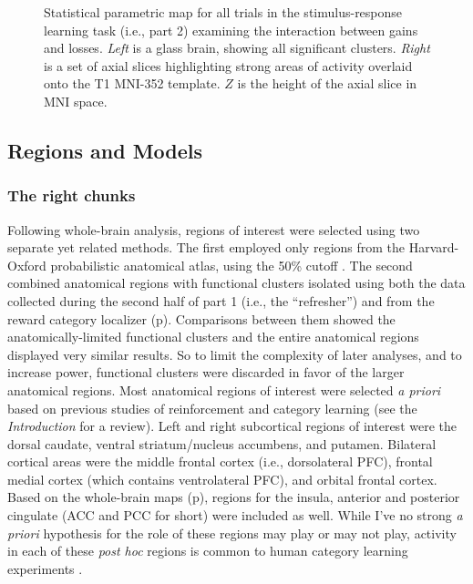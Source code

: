 \documentclass[doc,12pt]{apa}        %
\begin{document}
\begin{figure}[tp]
    \centering
	\caption{Statistical parametric map for all trials in the stimulus-response learning task (i.e., part 2) examining the interaction between gains and losses.  \emph{Left} is a glass brain, showing all significant clusters.  \emph{Right} is a set of axial slices highlighting strong areas of activity overlaid onto the T1 MNI-352 template.  $Z$ is the height of the axial slice in MNI space.}
	\label{fig:gxl}
\end{figure}

\subsection{Regions and Models}
\label{sub:regoins}
\subsubsection{The right chunks}
\label{subsub:chunks}
Following whole-brain analysis, regions of interest were selected using two separate yet related methods.  The first employed only regions from the Harvard-Oxford probabilistic anatomical atlas, using the 50\% cutoff \cite{Desikan:2006p9370}.  The second combined anatomical regions with functional clusters isolated using both the data collected during the second half of part 1 (i.e., the ``refresher'') and from the reward category localizer (p\pageref{subsub:datadetails}).  Comparisons between them showed the anatomically-limited functional clusters and the entire anatomical regions displayed very similar results.  So to limit the complexity of later analyses, and to increase power, functional clusters were discarded in favor of the larger anatomical regions.  Most anatomical regions of interest were selected \emph{a priori} based on previous studies of reinforcement and category learning (see the \emph{Introduction} for a review).  Left and right subcortical regions of interest were the dorsal caudate, ventral striatum/nucleus accumbens, and putamen.   Bilateral cortical areas were the middle frontal cortex (i.e., dorsolateral PFC), frontal medial cortex (which contains ventrolateral PFC), and orbital frontal cortex.  Based on the whole-brain maps (p\pageref{sub:blob}), regions for the insula, anterior and posterior cingulate (ACC and PCC for short) were included as well. While I've no strong \emph{a priori} hypothesis for the role of these regions may play or may not play, activity in each of these \emph{post hoc} regions is common to human category learning experiments \cite{LopezPaniagua:2011p8296,Seger:2010p7188,Cincotta:2007p6672,Seger:2006p5447,Seger:2005pd}.
\end{document}
